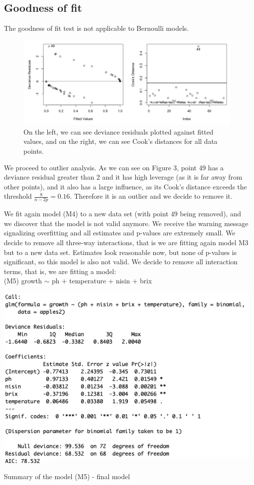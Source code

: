 \documentclass{article}
\begin{document}
\subsection{Goodness of fit}
The goodness of fit test is not applicable to Bernoulli models.
\begin{figure}[h!]
\centering
\includegraphics[scale = 0.35]{Rplot49.png}
\caption{On the left, we can see deviance residuals plotted against fitted values, and on the right, we can see Cook's distances  for all data points.}
\end{figure}

We proceed to outlier analysis. As we can see on Figure 3, point 49 has a deviance residual greater than 2 and it has high leverage (as it is far away from other points), and it also has a large influence, as its Cook's distance exceeds the threshold $\frac{8}{n-2p}=0.16$. Therefore it is an outlier and we decide to remove it. 

We fit again model (M4) to a new data set (with point 49 being removed), and we discover that the model is not valid anymore. We receive the warning message signalizing overfitting and all estimates and p-values are extremely small. We decide to remove all three-way interactions, that is we are fitting again model M3 but to a new data set. Estimates look reasonable now, but none of p-values is significant, so this model is also not valid. We decide to remove all interaction terms, that is, we are fitting a model:
\\(M5) growth $\sim$ ph + temperature + nisin + brix 
\begin{table}[h!]
\includegraphics[scale = 0.5]{table9.png}
\caption{Summary of the model (M5) - final model }
\end{table}
\\ 
\end{document}
